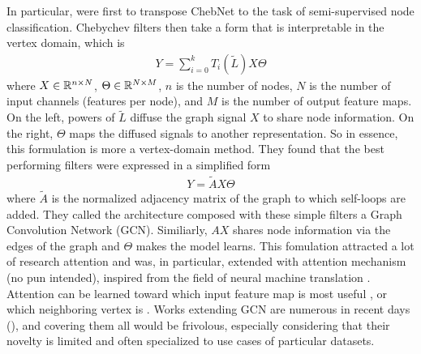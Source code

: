 In particular, \cite{kipf2016semi} were first to transpose ChebNet to the task of semi-supervised node classification. Chebychev filters then take a form that is interpretable in the vertex domain, which is
\begin{gather}
Y = \displaystyle\sum_{i=0}^k T_i(\widetilde{L}) X \Theta
\end{gather}
where $X \in \mathbb{R}^{n \times N}$, $\Theta \in \mathbb{R}^{N \times M}$, $n$ is the number of nodes, $N$ is the number of input channels (features per node), and $M$ is the number of output feature maps. On the left, powers of $\widetilde{L}$ diffuse the graph signal $X$ to share node information. On the right, $\Theta$ maps the diffused signals to another representation. So in essence, this formulation is more a vertex-domain method. They found that the best performing filters were expressed in a simplified form
\begin{gather}
Y = \widetilde{A} X \Theta
\end{gather}
where $\widetilde{A}$ is the normalized adjacency matrix of the graph to which self-loops are added. They called the architecture composed with these simple filters a Graph Convolution Network (GCN). Similiarly, $AX$ shares node information via the edges of the graph and $\Theta$ makes the model learns. This fomulation attracted a lot of research attention and was, in particular, extended with attention mechanism (no pun intended), inspired from the field of neural machine translation \citep{bahdanau2014neural}. Attention can be learned toward which input feature map is most useful \citep{velickovic2017graph}, or which neighboring vertex is \citep{lee2018attention}. Works extending GCN are numerous in recent days (\eg \cite{niepert2018towards}), and covering them all would be frivolous, especially considering that their novelty is limited and often specialized to use cases of particular datasets.

